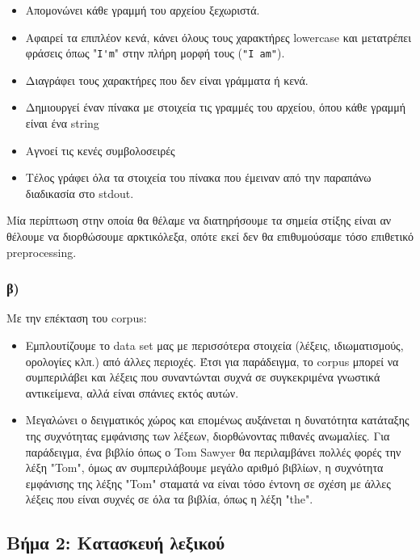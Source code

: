 \documentclass[a4paper, 12pt]{article}
\begin{document}
        	\begin{itemize}
        		\item Απομονώνει κάθε γραμμή του αρχείου ξεχωριστά.
        		\item Αφαιρεί τα επιπλέον κενά, κάνει όλους τους χαρακτήρες lowercase και μετατρέπει φράσεις όπως "\verb|I'm|" στην πλήρη μορφή τους (\verb|"I am"|). 
        		\item Διαγράφει τους χαρακτήρες που δεν είναι γράμματα ή κενά.
        		\item Δημιουργεί έναν πίνακα με στοιχεία τις γραμμές του αρχείου, όπου κάθε γραμμή είναι ένα string
        		\item Αγνοεί τις κενές συμβολοσειρές
        		\item Τέλος γράφει όλα τα στοιχεία του πίνακα που έμειναν από την παραπάνω διαδικασία στο stdout.
        	\end{itemize} 
        	
        	Μία περίπτωση στην οποία θα θέλαμε να διατηρήσουμε τα σημεία στίξης είναι αν θέλουμε να διορθώσουμε αρκτικόλεξα, οπότε εκεί δεν θα επιθυμούσαμε τόσο επιθετικό preprocessing.
        	
        \subsubsection*{β)}
        	Με την επέκταση του corpus: 
        	
        	\begin{itemize}
        		\item Εμπλουτίζουμε το data set μας με περισσότερα στοιχεία (λέξεις, ιδιωματισμούς, ορολογίες κλπ.) από άλλες περιοχές. Έτσι για παράδειγμα, το corpus μπορεί να συμπεριλάβει και λέξεις που συναντώνται συχνά σε συγκεκριμένα γνωστικά αντικείμενα, αλλά είναι σπάνιες εκτός αυτών.
        		\item Μεγαλώνει ο δειγματικός χώρος και επομένως αυξάνεται η δυνατότητα κατάταξης της συχνότητας εμφάνισης των λέξεων, διορθώνοντας πιθανές ανωμαλίες. Για παράδειγμα, ένα βιβλίο όπως ο Tom Sawyer θα περιλαμβάνει πολλές φορές την λέξη "Tom", όμως αν συμπεριλάβουμε μεγάλο αριθμό βιβλίων, η συχνότητα εμφάνισης της λέξης "Tom" σταματά να είναι τόσο έντονη σε σχέση με άλλες λέξεις που είναι συχνές σε όλα τα βιβλία, όπως η λέξη "the".
        	\end{itemize} 
        
    \subsection*{Βήμα 2: Κατασκευή λεξικού}
\end{document}
